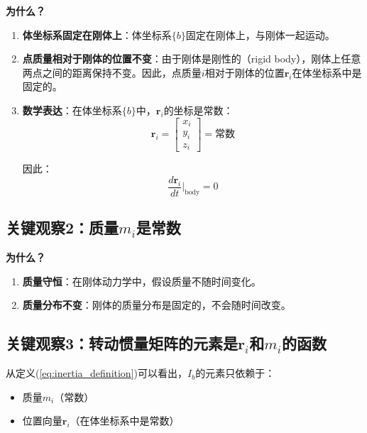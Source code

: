 \documentclass[12pt,a4paper]{article}
\begin{document}
\textbf{为什么？}

\begin{enumerate}
\item \textbf{体坐标系固定在刚体上}：体坐标系$\{b\}$固定在刚体上，与刚体一起运动。

\item \textbf{点质量相对于刚体的位置不变}：由于刚体是刚性的（rigid body），刚体上任意两点之间的距离保持不变。因此，点质量$i$相对于刚体的位置$\bm{r}_i$在体坐标系中是固定的。

\item \textbf{数学表达}：在体坐标系$\{b\}$中，$\bm{r}_i$的坐标是常数：
\begin{equation}
\bm{r}_i = \begin{bmatrix} x_i \\ y_i \\ z_i \end{bmatrix} = \text{常数}
\end{equation}

因此：
\begin{equation}
\frac{d\bm{r}_i}{dt}\Big|_{\text{body}} = 0
\end{equation}
\end{enumerate}

\subsection{关键观察2：质量$m_i$是常数}

\textbf{为什么？}

\begin{enumerate}
\item \textbf{质量守恒}：在刚体动力学中，假设质量不随时间变化。

\item \textbf{质量分布不变}：刚体的质量分布是固定的，不会随时间改变。
\end{enumerate}

\subsection{关键观察3：转动惯量矩阵的元素是$\bm{r}_i$和$m_i$的函数}

从定义(\ref{eq:inertia_definition})可以看出，$I_b$的元素只依赖于：
\begin{itemize}
\item 质量$m_i$（常数）
\item 位置向量$\bm{r}_i$（在体坐标系中是常数）
\end{itemize}
\end{document}
